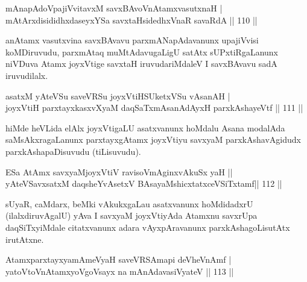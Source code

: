 
\begin{shl}
mAnapAdoVpajiVvitavxM savxBAvoV\s nAtamxvasutxnaH | \\
mAtArxdisididhxdaseyxYSa savxtaHsidedhxVnaR savaRdA \hfill||  110 ||  
\end{shl}

\begin{artha}
anAtamx vasutxvina savxBAvavu parxmANapAdavanunx upajiVvisi koMDiruvudu, parxmAtaq muMtAdavugaLigU satAtx sUPxtiRgaLanunx niVDuva Atamx joyxVtige savxtaH iruvudariMdaleV I savxBAvavu sadA iruvudilalx.
\end{artha}


\begin{shl}
asatxM yAteVSu saveVRSu joyxVtiHSUketxVSu \footnotemark[1]{}vAsanAH | \\
joyxVtiH parxtayxkasxvXyaM daqSaTxmAsanAdAyxH parxkAshayeVtf \hfill||  111 ||  
\end{shl}

\begin{artha}
hiMde heVLida elAlx joyxVtigaLU asatxvanunx hoMdalu Asana modalAda saMsAkxragaLanunx parxtayxgAtamx joyxVtiyu savxyaM parxkAshavAgidudx parxkAshapaDisuvudu (tiLisuvudu).
\end{artha}

\begin{shl}
ESa AtAmx savxyaMjoyxVtiV ravisoVmAginxvAkuSx yaH ||  \\
yAteVSavxsatxM daqsheYvA\s \s setxV BAsayaMshicxtatxceVSiTxtamf\hfill ||  112 ||  
\end{shl}

\begin{artha}
sUyaR, caMdarx, beMki vAkukxgaLau asatxvanunx hoMdidadxrU (ilalxdiruvAgalU) yAva I savxyaM joyxVtiyAda Atamxnu savxrUpa daqSiTxyiMdale citatxvanunx adara vAyxpAravanunx parxkAshagoLisutAtx irutAtxne.
\end{artha}

\begin{shl}
AtamxparxtayxyamAmeVyaH saveVRSAmapi deVheVnAmf | \\
yatoV\s toV\s nAtamxyoVgoV\s sayx na mAnAdavasiVyateV \hfill||  113 ||  
\end{shl}

